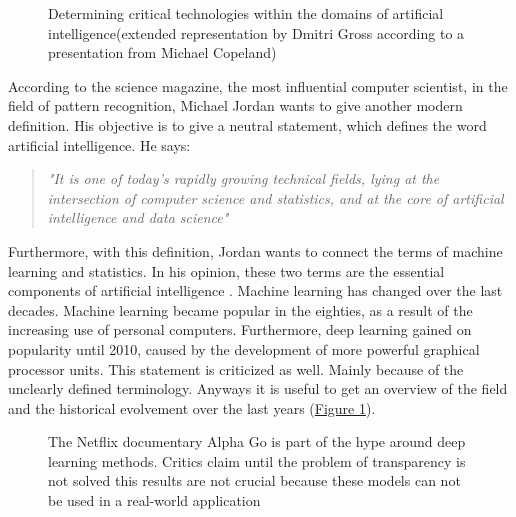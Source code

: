 \begin{figure}[!htp]
	\centering
	\caption{Determining critical technologies within the domains of artificial intelligence(extended representation by Dmitri Gross according to a presentation from Michael Copeland) \cite{Gross2017} \cite{COPELAND2017}}
	\label{fig:04_history_of_machine_learning}
\end{figure}

According to the science magazine, the most influential computer scientist, in the field of pattern recognition, Michael Jordan wants to give another modern definition. His objective is to give a neutral statement, which defines the word artificial intelligence. He says:

\begin{quote}
	\textit{"It is one of today's rapidly growing technical fields, lying at the intersection of computer science and statistics, and at the core of artificial intelligence and data science" \cite{Bohannon2016} \cite{Jordan255}}
\end{quote}

Furthermore, with this definition, Jordan wants to connect the terms of machine learning and statistics. In his opinion, these two terms are the essential components of artificial intelligence \cite{MichaelJordan2018}. Machine learning has changed over the last decades. Machine learning became popular in the eighties, as a result of the increasing use of personal computers. Furthermore, deep learning gained on popularity until 2010, caused by the development of more powerful graphical processor units. This statement is criticized as well. Mainly because of the unclearly defined terminology. Anyways it is useful to get an overview of the field and the historical evolvement over the last years (\hyperref[fig:04_history_of_machine_learning]{Figure \ref{fig:04_history_of_machine_learning}}). 

\begin{figure}[htp]
	\centering
	\caption{The Netflix documentary Alpha Go is part of the hype around deep learning methods. Critics claim until the problem of transparency is not solved this results are not crucial because these models can not be used in a real-world application \cite{Thetruec1:online}}
	\label{fig:05_deep_learning_sucess_with_alpha_go}
\end{figure}

